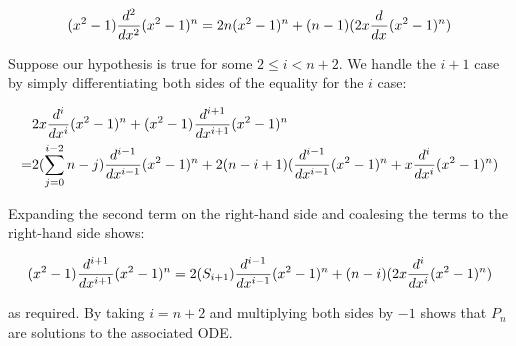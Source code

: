 \documentclass[12pt]{article}%
\newcommand{\Legen}[1][n]{(x^2 - 1)^{#1}}
\begin{document}
\begin{enumerate}[i.]
  \[(x^2 -1)\totder[2](x^2 -1)^n = 2n(x^2 - 1)^n + (n-1)(2x \totder (x^2 -1)^n) \]

  Suppose our hypothesis is true for some $2 \leq i < n + 2$. We handle the $i+1$ case by simply differentiating both sides of the equality for the $i$ case:

  \begin{align*}
      & 2x \totder[i] \Legen + \Legen[] \totder[i+1] \Legen \\
      = & 2(\sum_{j=0}^{i-2} n - j) \totder[i-1] \Legen + 2(n - i +1)(\totder[i-1]\Legen + x \totder[i]\Legen)
  \end{align*}

  Expanding the second term on the right-hand side and coalesing the terms to the right-hand side shows:

  \[ \Legen[] \totder[i+1] \Legen = 2(S_{i+1})\totder[i-1]\Legen + (n-i)(2x \totder[i] \Legen) \]

  as required. By taking $i = n+2$ and multiplying both sides by
  $-1$ shows that $P_n$ are solutions to the associated ODE.
\end{enumerate}
\end{document}
